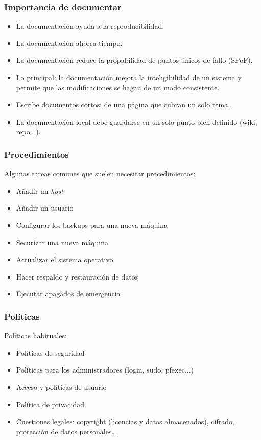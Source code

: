 \documentclass{beamer}
\begin{document}

\begin{frame}
\frametitle{Importancia de documentar}

\begin{itemize}
\item La documentación ayuda a la reproducibilidad. 
\item La documentación ahorra tiempo. 
\item La documentación reduce la propabilidad de puntos únicos de fallo (SPoF).
\item Lo principal: la documentación mejora la inteligibilidad de un sistema y permite que
	las modificaciones se hagan de un modo consistente.
\item Escribe documentos cortos: de una página que cubran un solo tema.
\item La documentación local debe guardarse en un solo punto bien definido (wiki, repo...).
\end{itemize}

\end{frame}





\begin{frame}
\frametitle{Procedimientos}

Algunas tareas comunes que suelen necesitar procedimientos:

\begin{itemize}
\item Añadir un \textit{host}
\item Añadir un usuario
\item Configurar los backups para una nueva máquina
\item Securizar una nueva máquina
\item Actualizar el sistema operativo
\item Hacer respaldo y restauración de datos
\item Ejecutar apagados de emergencia
\end{itemize}
\end{frame}


\begin{frame}
\frametitle{Políticas}

Políticas habituales:

\begin{itemize}
\item Políticas de seguridad
\item Políticas para los administradores (login, sudo, pfexec...)
\item Acceso y políticas de usuario
\item Política de privacidad
\item Cuestiones legales: copyright (licencias y datos almacenados), cifrado, protección de datos personales\dots
\end{itemize}
\end{frame}
\end{document}
